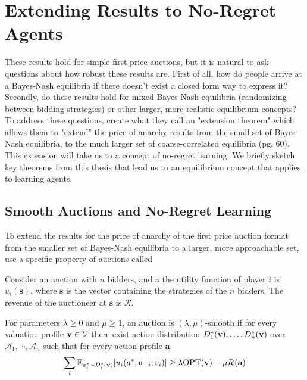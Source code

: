 \documentclass[12pt,twoside]{reedthesis}
\begin{document}
\section{Extending Results to No-Regret Agents}
These results hold for simple first-price auctions, but it is natural to ask questions about how robust these results are. First of all, how do people arrive at a Bayes-Nash equilibria if there doesn't exist a closed form way to express it? Secondly, do these results hold for mixed Bayes-Nash equilibria (randomizing between bidding strategies) or other larger, more realistic equilibrium concepts? To address these questions, \cite{Roughgarden2017} create what they call an "extension theorem" which allows them to "extend" the price of anarchy results from the small set of Bayes-Nash equilibria, to the much larger set of coarse-correlated equilibria (pg. 60).  This extension will take us to a concept of no-regret learning. We briefly sketch key theorems from this thesis that lead us to an equilibrium concept that applies to learning agents.


\subsection{Smooth Auctions and No-Regret Learning}
To extend the results for the price of anarchy of the first price auction format from the smaller set of Bayes-Nash equilibria to a larger, more approachable set, \cite{Roughgarden2017} use a specific property of auctions called 

\begin{dfn}
	Consider an auction with $n$ bidders, and a the utility function of player $i$ is $u_i(\textbf{s})$, where $\textbf{s}$ is the vector containing the strategies of the $n$ bidders. The revenue of the auctioneer at $\textbf{s}$ is $\mathcal{R}$.   
\end{dfn}

\begin{dfn}
	For parameters $\lambda \geq 0$ and $\mu \geq 1$, an auction is $(\lambda, \mu)$-smooth if for every valuation profile $\textbf{v} \in \mathcal{V}$ there exist action distribution $D_1^{*}(\textbf{v}), \ldots , D_n^*(\textbf{v})$ over $\mathcal{A}_1, \cdots, \mathcal{A}_n$ such that for every action profile \textbf{a},
	$$ \sum_i \mathbb{E}_{a_i^* \sim D_i^*(\textbf{v})}[u_i(a^*, \textbf{a}_{-i};v_i)] \geq \lambda \text{OPT}(\textbf{v}) - \mu \mathcal{R}(\textbf{a})$$
	\label{dfn:smoothauction}
\end{dfn}
\end{document}
